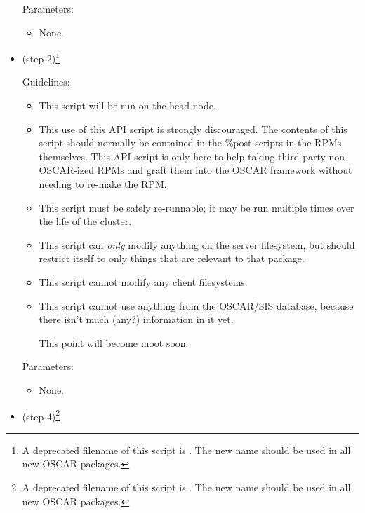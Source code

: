 \begin{itemize}
  Parameters:
  
  \begin{itemize}
  \item None.
  \end{itemize}

\endchange
  
\item {} (step 2)\footnote{A deprecated
    filename of this script is .  The
    new name  should be used in all
    new OSCAR packages.}
  
  Guidelines:

  \begin{itemize}
  \item This script will be run on the head node.
  \item This use of this API script is strongly discouraged.  The
    contents of this script should normally be contained in the \%post
    scripts in the RPMs themselves.  This API script is only here to
    help taking third party non-OSCAR-ized RPMs and graft them into
    the OSCAR framework without needing to re-make the RPM.
  \item This script must be safely re-runnable; it may be run multiple
    times over the life of the cluster.
  \item This script can {\em only} modify anything on the server
    filesystem, but should restrict itself to only things that are
    relevant to that package.
  \item This script cannot modify any client filesystems.
  \item This script cannot use anything from the OSCAR/SIS database,
    because there isn't much (any?) information in it yet.

    \begin{discuss}
      This point will become moot soon.
    \end{discuss}
  \end{itemize}

  Parameters:
  
  \begin{itemize}
  \item None.
  \end{itemize}
  
\item {} (step 4)\footnote{A deprecated
    filename of this script is .  The new
    name  should be used in all new
    OSCAR packages.}  
  

\end{itemize}
